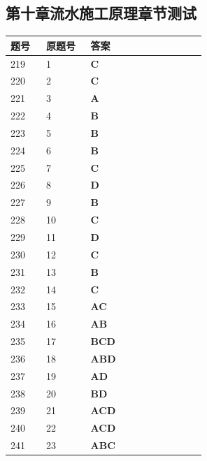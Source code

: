 \documentclass[UTF8,fontset=windows,11pt]{ctexart}
\begin{document}
\subsection*{第十章流水施工原理章节测试}
\begin{longtable}{p{0.16\linewidth}p{0.2\linewidth}p{0.52\linewidth}}
\textbf{\textcolor{examnavy}{题号}} & \textbf{\textcolor{examnavy}{原题号}} & \textbf{\textcolor{answergreen}{答案}} \\
\hline
219 & 1 & \textbf{\textcolor{answergreen}{C}} \\
220 & 2 & \textbf{\textcolor{answergreen}{C}} \\
221 & 3 & \textbf{\textcolor{answergreen}{A}} \\
222 & 4 & \textbf{\textcolor{answergreen}{B}} \\
223 & 5 & \textbf{\textcolor{answergreen}{B}} \\
224 & 6 & \textbf{\textcolor{answergreen}{B}} \\
225 & 7 & \textbf{\textcolor{answergreen}{C}} \\
226 & 8 & \textbf{\textcolor{answergreen}{D}} \\
227 & 9 & \textbf{\textcolor{answergreen}{B}} \\
228 & 10 & \textbf{\textcolor{answergreen}{C}} \\
229 & 11 & \textbf{\textcolor{answergreen}{D}} \\
230 & 12 & \textbf{\textcolor{answergreen}{C}} \\
231 & 13 & \textbf{\textcolor{answergreen}{B}} \\
232 & 14 & \textbf{\textcolor{answergreen}{C}} \\
233 & 15 & \textbf{\textcolor{answergreen}{AC}} \\
234 & 16 & \textbf{\textcolor{answergreen}{AB}} \\
235 & 17 & \textbf{\textcolor{answergreen}{BCD}} \\
236 & 18 & \textbf{\textcolor{answergreen}{ABD}} \\
237 & 19 & \textbf{\textcolor{answergreen}{AD}} \\
238 & 20 & \textbf{\textcolor{answergreen}{BD}} \\
239 & 21 & \textbf{\textcolor{answergreen}{ACD}} \\
240 & 22 & \textbf{\textcolor{answergreen}{ACD}} \\
241 & 23 & \textbf{\textcolor{answergreen}{ABC}} \\
\end{longtable}
\vspace{0.4em}
\end{document}
